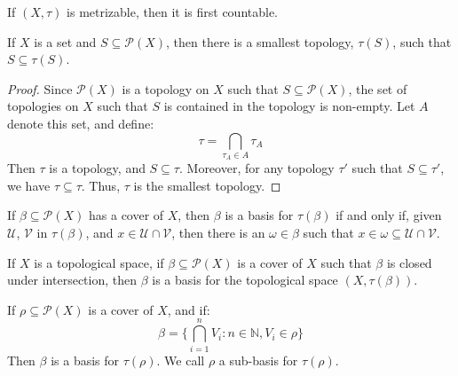             \begin{theorem}
                If $(X,\tau)$ is metrizable, then it is first
                countable.
            \end{theorem}
            \begin{theorem}
                If $X$ is a set and $S\subseteq\mathcal{P}(X)$,
                then there is a smallest topology, $\tau(S)$, such
                that $S\subseteq\tau(S)$.
            \end{theorem}
            \begin{proof}
                Since $\mathcal{P}(X)$ is a topology on $X$ such
                that $S\subseteq\mathcal{P}(X)$, the set of
                topologies on $X$ such that $S$ is contained in
                the topology is non-empty. Let $A$ denote this set,
                and define:
                \begin{equation}
                    \tau=\bigcap_{\tau_{A}\in{A}}\tau_{A}
                \end{equation}
                Then $\tau$ is a topology, and $S\subseteq\tau$.
                Moreover, for any topology $\tau'$ such
                that $S\subseteq\tau'$, we have $\tau\subseteq\tau$.
                Thus, $\tau$ is the smallest topology.
            \end{proof}
            \begin{theorem}
                If $\beta\subseteq\mathcal{P}(X)$ has a cover of
                $X$, then $\beta$ is a basis for
                $\tau(\beta)$ if and only if, given $\mathcal{U}$,
                $\mathcal{V}$ in $\tau(\beta)$, and
                $x\in\mathcal{U}\cap\mathcal{V}$, then there is an
                $\omega\in\beta$ such that
                $x\in\omega\subseteq\mathcal{U}\cap\mathcal{V}$.
            \end{theorem}
            \begin{theorem}
                If $X$ is a topological space, if
                $\beta\subseteq\mathcal{P}(X)$ is a cover of $X$
                such that $\beta$ is closed under intersection,
                then $\beta$ is a basis for the topological space
                $(X,\tau(\beta))$.
            \end{theorem}
            \begin{theorem}
                If $\rho\subseteq\mathcal{P}(X)$ is a cover of
                $X$, and if:
                \begin{equation}
                    \beta=\Big\{\bigcap_{i=1}^{n}V_{i}:
                        n\in\mathbb{N},V_{i}\in\rho\Big\}
                \end{equation}
                Then $\beta$ is a basis for $\tau(\rho)$. We call
                $\rho$ a sub-basis for $\tau(\rho)$.
            \end{theorem}

